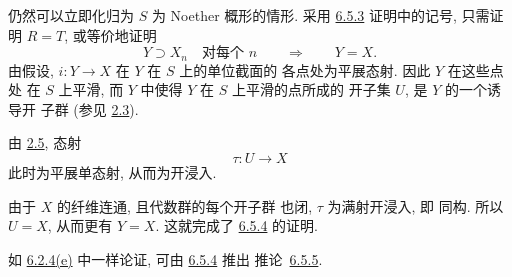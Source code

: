 仍然可以立即化归为 \(S\) 为
Noether 概形的情形. 采用 \hyperref[cor:sga3-VIB-6.5.3]{6.5.3} 证明中的记号,
只需证明 \(R=T\), 或等价地证明
\[
  Y\supset X_n\quad\text{对每个 }n
  \qquad\Longrightarrow\qquad
  Y=X.
\]
由假设, \(i:Y\to X\) 在 \(Y\) 在 \(S\) 上的单位截面的
各点处为平展态射. 因此 \(Y\) 在这些点处
在 \(S\) 上平滑, 而 \(Y\) 中使得 \(Y\) 在 \(S\) 上平滑的点所成的
开子集 \(U\), 是 \(Y\) 的一个诱导开
子群
(参见 \hyperref[cor:sga3-VIB-2.3]{2.3}).
\begin{samepage}
由 \hyperref[prop:sga3-VIB-2.5]{2.5}, 态射
\[
  \tau:U\longrightarrow X
\]
此时为平展单态射, 从而为开浸入.
\end{samepage}
由于 \(X\) 的纤维连通, 且代数群的每个开子群
也闭, \(\tau\) 为满射开浸入, 即
同构. 所以 \(U=X\), 从而更有 \(Y=X\).
这就完成了 \hyperref[cor:sga3-VIB-6.5.4]{6.5.4} 的证明.

如 \hyperref[ex:sga3-VIB-6.2.4-e]{6.2.4\textup{(e)}}
中一样论证, 可由 \hyperref[cor:sga3-VIB-6.5.4]{6.5.4} 推出
推论~\hyperref[cor:sga3-VIB-6.5.5]{6.5.5}.


